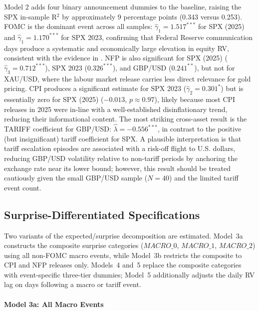 \documentclass[12pt,a4paper]{report}
\begin{document}
Model 2 adds four binary announcement dummies to the baseline, raising the SPX in-sample R$^2$ by approximately 9 percentage points (0.343 versus 0.253). FOMC is the dominant event across all samples: $\hat{\gamma}_1 = 1.517^{***}$ for SPX (2025) and $\hat{\gamma}_1 = 1.170^{***}$ for SPX 2023, confirming that Federal Reserve communication days produce a systematic and economically large elevation in equity RV, consistent with the evidence in \citet{Bernanke2005}. NFP is also significant for SPX (2025) ($\hat{\gamma}_3 = 0.712^{***}$), SPX 2023 ($0.326^{***}$), and GBP/USD ($0.241^{**}$), but not for XAU/USD, where the labour market release carries less direct relevance for gold pricing. CPI produces a significant estimate for SPX 2023 ($\hat{\gamma}_2 = 0.301^{*}$) but is essentially zero for SPX (2025) ($-0.013$, $p \approx 0.97$), likely because most CPI releases in 2025 were in-line with a well-established disinflationary trend, reducing their informational content. The most striking cross-asset result is the TARIFF coefficient for GBP/USD: $\hat{\lambda} = -0.556^{***}$, in contrast to the positive (but insignificant) tariff coefficient for SPX. A plausible interpretation is that tariff escalation episodes are associated with a risk-off flight to U.S. dollars, reducing GBP/USD volatility relative to non-tariff periods by anchoring the exchange rate near its lower bound; however, this result should be treated cautiously given the small GBP/USD sample ($N = 40$) and the limited tariff event count.

\subsection{Surprise-Differentiated Specifications}

Two variants of the expected/surprise decomposition are estimated. Model~3a constructs the composite surprise categories ($MACRO\_0$, $MACRO\_1$, $MACRO\_2$) using all non-FOMC macro events, while Model~3b restricts the composite to CPI and NFP releases only. Models~4 and~5 replace the composite categories with event-specific three-tier dummies; Model~5 additionally adjusts the daily RV lag on days following a macro or tariff event.

\paragraph{Model 3a: All Macro Events}\mbox{}\\
\end{document}
